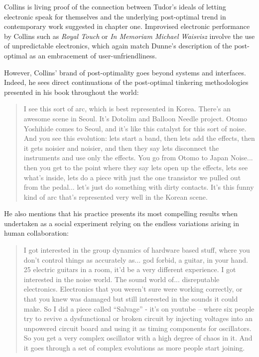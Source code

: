 Collins is living proof of the connection between Tudor's ideals of letting electronic speak for themselves and the underlying post-optimal trend in contemporary work suggested in chapter one. Improvised electronic performance by Collins such as \textit{Royal Touch} or \textit{In Memoriam Michael Waisvisz} involve the use of unpredictable electronics, which again match Dunne's description of the post-optimal as an embracement of user-unfriendliness. 


However, Collins' brand of post-optimality goes beyond systems and interfaces. Indeed, he sees direct continuations of the post-optimal tinkering methodologies presented in his book throughout the world: 

\begin{quote}
	I see this sort of arc, which is best represented in Korea. There’s an awesome scene in Seoul. It’s Dotolim and Balloon Needle project. Otomo Yoshihide comes to Seoul, and it’s like this catalyst for this sort of noise. And you see this evolution: lets start a band, then lets add the effects, then it gets noisier and noisier, and then they say lets disconnect the instruments and use only the effects. You go from Otomo to Japan Noise... then you get to the point where they say lets open up the effects, lets see what’s inside, lets do a piece with just the one transistor we pulled out from the pedal... let’s just do something with dirty contacts. It’s this funny kind of arc that’s represented very well in the Korean scene.
\end{quote}

He also mentions that his practice presents its most compelling results when undertaken as a social experiment relying on the endless variations arising in human collaboration:

\begin{quote}
	I got interested in the group dynamics of hardware based stuff, where you don’t control things as accurately as... god forbid, a guitar, in your hand. 25 electric guitars in a room, it’d be a very different experience. I got interested in the noise world. The sound world of... disreputable electronics. Electronics that you weren’t sure were working correctly, or that you knew was damaged but still interested in the sounds it could make. So I did a piece called “Salvage” - it’s on youtube – where six people try to revive a dysfunctional or broken circuit by injecting voltages into an unpowered circuit board and using it as timing components for oscillators. So you get a very complex oscillator with a high degree of chaos in it. And it goes through a set of complex evolutions as more people start joining. 
\end{quote}

